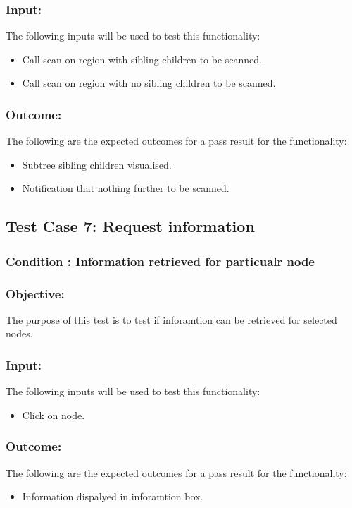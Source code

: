 \documentclass[hidelinks,a4paper,12pt]{article}
\begin{document}
\subsubsection{Input:}
 The following inputs will be used to test this functionality:
\begin{itemize}
  \item Call scan on region with sibling children to be scanned.
   \item Call scan on region with no  sibling children to be scanned.

\end{itemize}

\subsubsection{Outcome: }
The following are the expected outcomes for a pass result for the functionality:
\begin{itemize}
\item Subtree  sibling children visualised.
\item Notification that nothing further to be scanned.

\end{itemize}

\subsection{Test Case 7: Request information }
\subsubsection{Condition : Information retrieved for particualr node}
\subsubsection{Objective:} The purpose of this test is to test if inforamtion can be retrieved for selected nodes.

\subsubsection{Input:}
 The following inputs will be used to test this functionality:
\begin{itemize}
  \item Click on node.
  

\end{itemize}

\subsubsection{Outcome: }
The following are the expected outcomes for a pass result for the functionality:
\begin{itemize}
\item Information dispalyed in inforamtion box.

\end{itemize}
\end{document}
